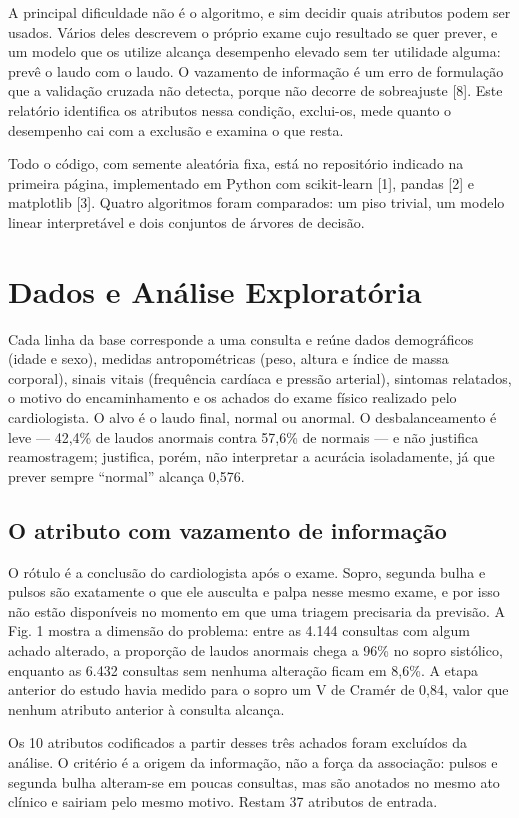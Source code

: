 \documentclass[conference]{IEEEtran}
\begin{document}
A principal dificuldade não é o algoritmo, e sim decidir quais atributos podem ser usados. Vários deles descrevem o próprio exame cujo resultado se quer prever, e um modelo que os utilize alcança desempenho elevado sem ter utilidade alguma: prevê o laudo com o laudo. O vazamento de informação é um erro de formulação que a validação cruzada não detecta, porque não decorre de sobreajuste [8]. Este relatório identifica os atributos nessa condição, exclui-os, mede quanto o desempenho cai com a exclusão e examina o que resta.

Todo o código, com semente aleatória fixa, está no repositório indicado na primeira página, implementado em Python com scikit-learn [1], pandas [2] e matplotlib [3]. Quatro algoritmos foram comparados: um piso trivial, um modelo linear interpretável e dois conjuntos de árvores de decisão.

\section{Dados e Análise Exploratória}
Cada linha da base corresponde a uma consulta e reúne dados demográficos (idade e sexo), medidas antropométricas (peso, altura e índice de massa corporal), sinais vitais (frequência cardíaca e pressão arterial), sintomas relatados, o motivo do encaminhamento e os achados do exame físico realizado pelo cardiologista. O alvo é o laudo final, normal ou anormal. O desbalanceamento é leve --- 42,4\% de laudos anormais contra 57,6\% de normais --- e não justifica reamostragem; justifica, porém, não interpretar a acurácia isoladamente, já que prever sempre ``normal'' alcança 0,576.

\subsection{O atributo com vazamento de informação}
O rótulo é a conclusão do cardiologista após o exame. Sopro, segunda bulha e pulsos são exatamente o que ele ausculta e palpa nesse mesmo exame, e por isso não estão disponíveis no momento em que uma triagem precisaria da previsão. A Fig. 1 mostra a dimensão do problema: entre as 4.144 consultas com algum achado alterado, a proporção de laudos anormais chega a 96\% no sopro sistólico, enquanto as 6.432 consultas sem nenhuma alteração ficam em 8,6\%. A etapa anterior do estudo havia medido para o sopro um V de Cramér de 0,84, valor que nenhum atributo anterior à consulta alcança.

Os 10 atributos codificados a partir desses três achados foram excluídos da análise. O critério é a origem da informação, não a força da associação: pulsos e segunda bulha alteram-se em poucas consultas, mas são anotados no mesmo ato clínico e sairiam pelo mesmo motivo. Restam 37 atributos de entrada.
\end{document}
